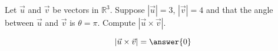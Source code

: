 \documentclass{ximera}
\author{Gregory Hartman \and Matthew Carr}
\begin{document}
\begin{exercise}



Let $\vec{u}$ and $\vec{v}$ be vectors in $\mathbb{R}^3$. Suppose $|\vec{u}|=3$, $|\vec{v}|=4$ and that the angle between $\vec{u}$ and $\vec{v}$ is $\theta=\pi$. Compute $|\vec{u}\times\vec{v}|$.

\begin{prompt}
\[
|\vec{u}\times\vec{v}|=\answer{0}
\]
\end{prompt}


\end{exercise}
\end{document}
